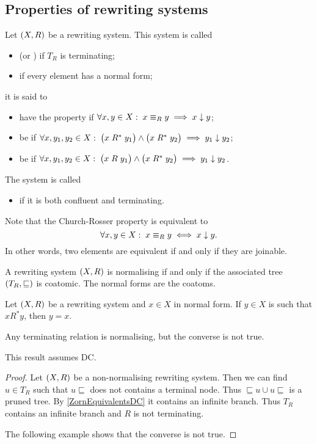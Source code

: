 \subsection{Properties of rewriting systems}
\begin{definition}
Let $\sSet{X, R}$ be a rewriting system. This system is called
\begin{itemize}
\item {} (or ) if $T_R$ is terminating;
\item {} if every element has a normal form;
\end{itemize}
it is said to
\begin{itemize}
\item have the  property if $\forall x,y\in X: \; x\mathrel{\equiv_R}y \implies x \mathrel{\downarrow} y$;
\item be  if $\forall x,y_1, y_2\in X: \; \big(x\mathrel{R^*}y_1\big) \land \big(x\mathrel{R^*}y_2\big) \implies y_1 \mathrel{\downarrow} y_2$;
\item be  if $\forall x,y_1, y_2\in X: \; \big(x\mathrel{R}y_1\big) \land \big(x\mathrel{R^*}y_2\big) \implies y_1 \mathrel{\downarrow} y_2$.
\end{itemize}
The system is called
\begin{itemize}
\item {} if it is both confluent and terminating.
\end{itemize}
\end{definition}
Note that the Church-Rosser property is equivalent to
\[ \forall x,y\in X: \; x\mathrel{\equiv_R}y \iff x \mathrel{\downarrow} y. \]
In other words, two elements are equivalent if and only if they are joinable.

A rewriting system $\sSet{X, R}$ is normalising if and only if the associated tree $\sSet{T_R, \sqsubseteq}$ is coatomic. The normal forms are the coatoms.

\begin{lemma} \label{successionNormalForm}
Let $\sSet{X,R}$ be a rewriting system and $x\in X$ in normal form. If $y\in X$ is such that $xR^*y$, then $y=x$. 
\end{lemma}

\begin{proposition}
Any terminating relation is normalising, but the converse is not true.
\end{proposition}
This result assumes DC.
\begin{proof}
Let $\sSet{X, R}$ be a non-normalising rewriting system. Then we can find $u\in T_R$ such that $u{\sqsubseteq}$ does not contains a terminal node. Thus ${\sqsubseteq}u \cup u{\sqsubseteq}$ is a pruned tree. By \ref{ZornEquivalentsDC} it contains an infinite branch. Thus $T_R$ contains an infinite branch and $R$ is not terminating.

The following example shows that the converse is not true.
\end{proof}

